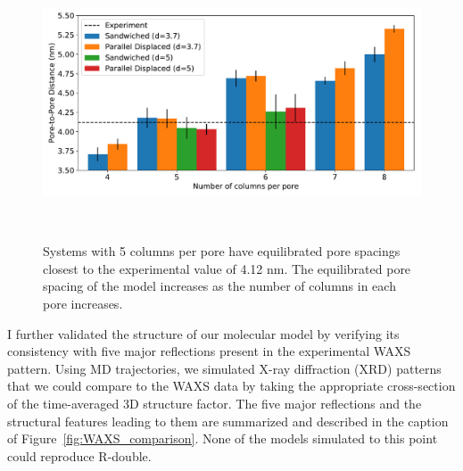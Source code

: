 \documentclass{article}
\begin{document}
  \begin{figure}
    \centering
    \vspace{-0.5cm}
    \includegraphics[width=\linewidth]{p2p.pdf}
    \caption{Systems with 5 columns per pore have equilibrated pore spacings
            closest to the experimental value of 4.12 nm. The equilibrated 
            pore spacing of the model increases as the number of columns in
            each pore increases.}~\label{fig:p2p}
    \vspace{-1.75cm}
  \end{figure}
  

  I further validated the structure of our molecular model by verifying 
  its consistency with five major reflections present in the experimental
  WAXS pattern. Using MD trajectories, we simulated X-ray diffraction (XRD)
  patterns that we could compare to the WAXS data by taking the appropriate
  cross-section of the time-averaged 3D structure factor. The five major 
  reflections and the structural features leading to them are summarized
  and described in the caption of Figure~\ref{fig:WAXS_comparison}. None of
  the models simulated to this point could reproduce R-double.   
  
\end{document}
